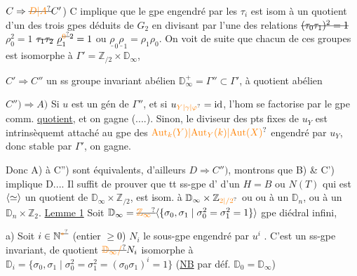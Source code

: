 $C\Rightarrow\deleted{\unsure{D|A}}C'$) C implique que le  gpe engendré
par les $\tau_i$ est isom à un quotient d'un
des trois gpes déduits de $G_2$ en
divisant par l'une des relations $\deleted{(\tau_0\tau_1)^2=1}$ $\rho_0^2=1$
$\deleted{\tau_1\tau_2}\ \underline{\rho}_1^{\deleted{\unsure{0}}2}=1$ ou $\underline{\rho}_0\underline{\rho}_1=\rho_1\rho_0$. On voit  de
suite que chacun de ces groupes est
isomorphe à $\Gamma'=\mathbb Z_{/2}\times\mathbb D_\infty$,

$C'\Rightarrow C''$\quad {}
 un ss groupe invariant abélien  $\mathbb D_\infty^+=\Gamma''\subset\Gamma'$, 
à quotient abélien

$C'')\Rightarrow A)$ Si $u$ est un gén\unsure{,} de $\Gamma''$, et si $u_{\unsure{Y|\gamma|\varphi}}=\mathrm{id}$, l'hom
se factorise par le gpe comm. \uline{quotient}, et on
gagne (....). Sinon, le diviseur des pts fixes de
$u_Y$ est intrinsèquemt attaché  au  gpe des $\unsure{\mathrm{Aut}_k(Y)|\mathrm{Aut}_Y(k)|\mathrm{Aut}(X)}$
engendré par $u_Y$, donc stable par $\Gamma'$, on gagne.

Donc A) à C'') sont équivalents, d'ailleurs
$D\Rightarrow C'')$, montrons que B) \& C') implique
D.... Il suffit de prouver que tt ss-gpe d'
 d'un $H=B$ ou $N(T)$ qui est $\inserted{\simeq}$ un
quotient de $\mathbb D_\infty\times\mathbb Z_{/2}$, est isom. à $\mathbb D_\infty\times\mathbb Z_{\unsure{2|/2}}$ ou
ou à un $\mathbb D_n$, ou à un $\mathbb D_n\times\mathbb Z_2$.
\uline{Lemme 1} Soit $\mathbb D_\infty=\deleted{\unsure{\mathbb Z_\infty}}\inserted{\{\sigma_0,\sigma_1\mid\sigma_0^2=\sigma_1^2=1\}}$ gpe diédral infini,  
 

a) Soit $i\in\mathbb N^{\deleted{\unsure{*}}}$ (entier $\geq0$) 
 $N_i$ le sous-gpe engendré
par $u^i$ . C'est un ss-gpe invariant,  de quotient $\deleted{\unsure{\mathbb D_\infty/}}N_i$
isomorphe à $\mathbb D_i=\{\sigma_0,\sigma_1\mid\sigma_0^2=\sigma_1^2=(\sigma_0\sigma_1)^i=1\}$ (\uline{NB} par déf. $\mathbb D_0=\mathbb D_\infty$)

